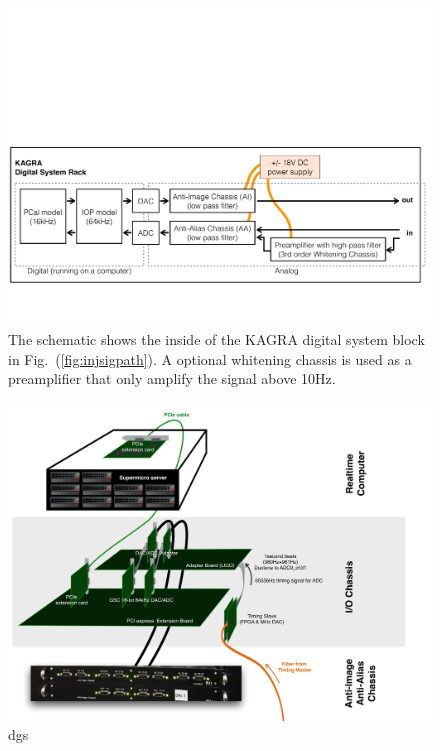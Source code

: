 \begin{figure}[hbt!]
\centering
\includegraphics[width=1\textwidth]{figure/dgs_rack}
\caption[dgs]{The schematic shows the inside of the KAGRA digital system block in Fig.~(\ref{fig:injsigpath}). A optional whitening chassis is used as a preamplifier that only amplify the signal above 10Hz.     }
\label{fig:dgs_rack}
\end{figure}


\begin{figure}[hbt!]
\centering
\includegraphics[width=1\textwidth]{figure/dgs}
\caption[dgs]{dgs }
\label{fig:dgs}
\end{figure}



